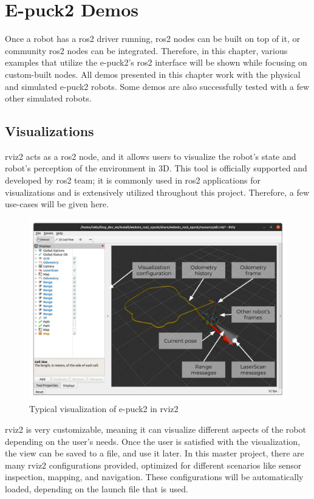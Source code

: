 \chapter{E-puck2 Demos}
\label{chap:demos}

Once a robot has a \ac{ros2} driver running, \ac{ros2} nodes can be built on top of it, or community \ac{ros2} nodes can be integrated.
Therefore, in this chapter, various examples that utilize the e-puck2's \ac{ros2} interface will be shown while focusing on custom-built nodes.
All demos presented in this chapter work with the physical and simulated e-puck2 robots.
Some demos are also successfully tested with a few other simulated robots.

\section{Visualizations}
\acs{rviz2} acts as a \ac{ros2} node, and it allows users to visualize the robot's state and robot's perception of the environment in 3D.
This tool is officially supported and developed by \ac{ros2} team; it is commonly used in \ac{ros2} applications for visualizations and is extensively utilized throughout this project. 
Therefore, a few use-cases will be given here.

\begin{figure}[H]
    \centering
    \includegraphics[width=\textwidth]{demos/figures/rviz.pdf}
    \caption{Typical visualization of e-puck2 in \acs{rviz2}}
    \label{fig:demos:rviz}
\end{figure}

\ac{rviz2} is very customizable, meaning it can visualize different aspects of the robot depending on the user's needs.
Once the user is satisfied with the visualization, the view can be saved to a file, and use it later.
In this master project, there are many \ac{rviz2} configurations provided, optimized for different scenarios like sensor inspection, mapping, and navigation.
These configurations will be automatically loaded, depending on the launch file that is used.

